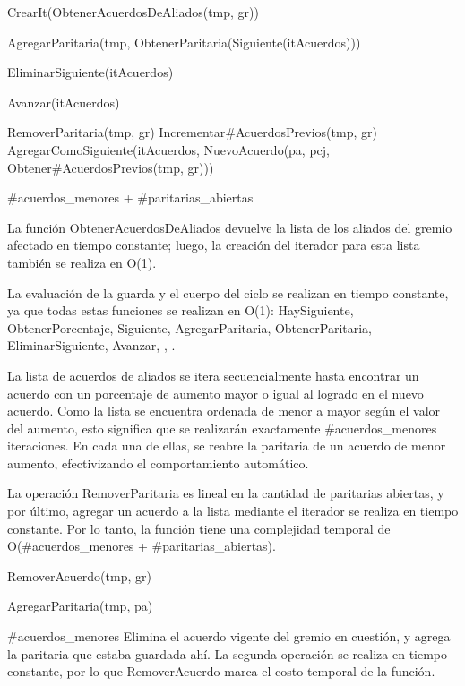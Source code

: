 {

	\state {} \asig CrearIt(ObtenerAcuerdosDeAliados(tmp, gr))		
			
		\state

		\state AgregarParitaria(tmp, ObtenerParitaria(Siguiente(itAcuerdos)))		

		\state EliminarSiguiente(itAcuerdos)										

		\state
		\state Avanzar(itAcuerdos)													
	\endwhile
	\state

	\state {} \asig RemoverParitaria(tmp, gr)											
	\state Incrementar\#AcuerdosPrevios(tmp, gr)														
	\state AgregarComoSiguiente(itAcuerdos, NuevoAcuerdo(pa, pcj, Obtener\#AcuerdosPrevios(tmp, gr)))	
}
{\#acuerdos\_menores + \#paritarias\_abiertas}
{La función ObtenerAcuerdosDeAliados devuelve la lista de los aliados del gremio afectado en tiempo constante; luego, la creación del iterador para esta lista también se realiza en O(1). 

\hspace{10pt} La evaluación de la guarda y el cuerpo del ciclo se realizan en tiempo constante, ya que todas estas funciones se realizan en O(1): HaySiguiente, ObtenerPorcentaje, Siguiente, AgregarParitaria, ObtenerParitaria, EliminarSiguiente, Avanzar, \lyl, \menor.

\hspace{10pt} La lista de acuerdos de aliados se itera secuencialmente hasta encontrar un acuerdo con un porcentaje de aumento mayor o igual al logrado en el nuevo acuerdo. Como la lista se encuentra ordenada de menor a mayor según el valor del aumento, esto significa que se realizarán exactamente \#acuerdos\_menores iteraciones. En cada una de ellas, se reabre la paritaria de un acuerdo de menor aumento, efectivizando el comportamiento automático.

\hspace{10pt} La operación RemoverParitaria es lineal en la cantidad de paritarias abiertas, y por último, agregar un acuerdo a la lista mediante el iterador se realiza en tiempo constante. Por lo tanto, la función tiene una complejidad temporal de O(\#acuerdos\_menores + \#paritarias\_abiertas).  }

{
	\state {} \asig RemoverAcuerdo(tmp, gr)			

	\state AgregarParitaria(tmp, pa)									
}
{\#acuerdos\_menores}
{ Elimina el acuerdo vigente del gremio en cuesti\'on, y agrega la paritaria que estaba guardada ah\'i. La segunda operaci\'on se realiza en tiempo constante, por lo que RemoverAcuerdo marca el costo temporal de la funci\'on.}

